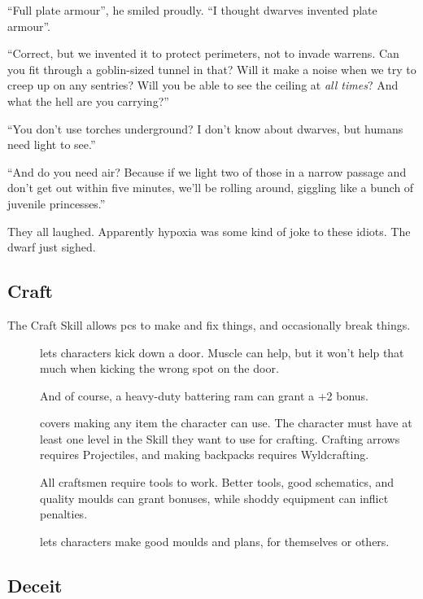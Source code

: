 \begin{multicols}{2}
\begin{exampletext}
  ``Full plate armour'', he smiled proudly.
  ``I thought dwarves invented plate armour''.

  ``Correct, but we invented it to protect perimeters, not to invade warrens.
  Can you fit through a goblin-sized tunnel in that?
  Will it make a noise when we try to creep up on any sentries?
  Will you be able to see the ceiling at \emph{all times}?
  And what the hell are you carrying?''

  ``You don't use torches underground?
  I don't know about dwarves, but humans need light to see.''

  ``And do you need air?
  Because if we light two of those in a narrow passage and don't get out within five minutes, we'll be rolling around, giggling like a bunch of juvenile princesses.''

  They all laughed.
  Apparently hypoxia was some kind of joke to these idiots.
  The dwarf just sighed.
  
\end{exampletext}

\subsection{Craft}

The Craft Skill allows \glspl{pc} to make and fix things, and occasionally break things.

\begin{description}
  \item[]
    lets characters kick down a door.
    Muscle can help, but it won't help that much when kicking the wrong spot on the door.

    And of course, a heavy-duty battering ram can grant a +2 bonus.
  \item[]
    covers making any item the character can use.
    The character must have at least one level in the Skill they want to use for crafting.
    Crafting arrows requires Projectiles, and making backpacks requires Wyldcrafting.

    All craftsmen require tools to work.
    Better tools, good schematics, and quality moulds can grant bonuses, while shoddy equipment can inflict penalties.
  \item[]
    lets characters make good moulds and plans, for themselves or others.
\end{description}

\subsection{Deceit}


\end{multicols}
